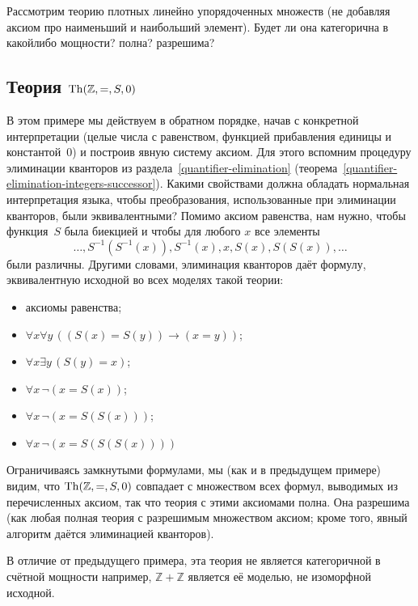 \begin{problem}
Рассмотрим теорию плотных линейно упорядоченных множеств (не
добавляя аксиом про наименьший и наибольший элемент). Будет ли
она категорична в какой\д либо мощности? полна? разрешима?
\end{problem}

\subsection*{Теория $\operatorname{Th}(\mathbb{Z},{=},{S},0)$}
В этом примере мы действуем в обратном порядке, начав с
конкретной интерпретации (целые числа с равенством, функцией
прибавления единицы и константой~$0$) и построив явную систему
аксиом. Для этого вспомним процедуру элиминации кванторов из
раздела~\ref{quantifier-elimination}
(теорема~\ref{quantifier-elimination-integers-successor}).
Какими свойствами должна обладать нормальная интерпретация
языка, чтобы преобразования, использованные при элиминации
кванторов, были эквивалентными? Помимо аксиом равенства, нам
нужно, чтобы функция~$S$ была биекцией и чтобы для любого $x$
все элементы
      $$
\dots,S^{-1}(S^{-1}(x)), S^{-1}(x), x,S(x),S(S(x)),\dots
      $$
были различны. Другими словами, элиминация кванторов даёт
формулу, эквивалентную исходной во всех моделях такой теории:
\begin{itemize}
        \item
аксиомы равенства;
        \item
$\forall x \forall y\, ((S(x)=S(y))\to(x=y))$;
        \item
$\forall x \exists y\, (S(y)=x)$;
        \item
$\forall x \, \lnot (x=S(x))$;
        \item
$\forall x \, \lnot (x=S(S(x)))$;
        \item
$\forall x \, \lnot (x=S(S(S(x))))$ 
\end{itemize}

Ограничиваясь замкнутыми формулами, мы (как и в предыдущем
примере) видим, что $\operatorname{Th}(\mathbb{Z},{=},{S},0)$ совпадает с
множеством всех формул, выводимых из перечисленных аксиом, так
что теория с этими аксиомами полна. Она разрешима (как любая
полная теория с разрешимым множеством аксиом; кроме того, явный
алгоритм даётся элиминацией кванторов).

В отличие от предыдущего примера, эта теория не является
категоричной в счётной мощности \т например,
$\mathbb{Z}+\mathbb{Z}$ является её моделью, не изоморфной
исходной.


